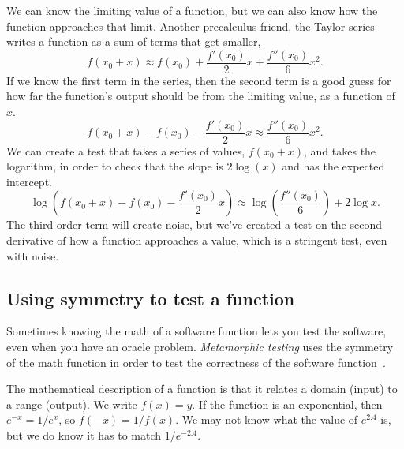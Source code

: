 \documentclass[fleqn,10pt]{olplainarticle}
\begin{document}
We can know the limiting value of a
function, but we can also know how the function approaches
that limit. Another precalculus friend, the Taylor series
writes a function as a sum of terms that get smaller,
\begin{equation}
  f(x_0+x) \approx f(x_0) + \frac{f'(x_0)}{2}x + \frac{f''(x_0)}{6}x^2.
\end{equation}
If we know the first term in the series, then the second term
is a good guess for how far the function's output should be from
the limiting value, as a function of $x$.
\begin{equation}
  f(x_0+x)  - f(x_0) - \frac{f'(x_0)}{2}x \approx \frac{f''(x_0)}{6}x^2.
\end{equation}
We can create a test that takes a series of values,
$f(x_0+x)$, and takes the logarithm, in order to check that
the slope is $2\log(x)$ and has the expected intercept.
\begin{equation}
  \log\left(f(x_0+x)  - f(x_0) - \frac{f'(x_0)}{2}x\right) \approx \log\left(\frac{f''(x_0)}{6}\right) + 2\log x.
\end{equation}
The third-order term will create noise, but we've created a
test on the second derivative of how a function approaches a
value, which is a stringent test, even with noise.


\subsection{Using symmetry to test a function}\label{sec:symmetry-test}

Sometimes knowing the math of a software function lets you
test the software, even when you have an oracle problem.
\emph{Metamorphic testing} uses the symmetry of the math function
in order to test the correctness of the software function~\citep{ding2016,guderlei2007,kanewala2015,liu2014}.

The mathematical description of a function is that it relates
a domain (input) to a range (output). We write $f(x) = y$.
If the function is an exponential, then $e^{-x} = 1 / e^x$,
so $f(-x) = 1 / f(x)$. We may not know what the value of
$e^{2.4}$ is, but we do know it has to match $1 / e^{-2.4}$.
\end{document}
